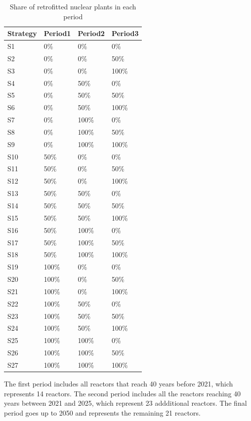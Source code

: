 \begin{table}
	\centering
	\caption{Share of retrofitted nuclear plants in each period}
	\label{tab:shareNukeRetrofit}
	\begin{tabular}{llll}
		\toprule
		Strategy & Period1 & Period2 & Period3 \\
		\midrule
		S1 & 0\% & 0\% & 0\% \\
		S2 & 0\% & 0\% & 50\% \\
		S3 & 0\% & 0\% & 100\% \\
		S4 & 0\% & 50\% & 0\% \\
		S5 & 0\% & 50\% & 50\% \\
		S6 & 0\% & 50\% & 100\% \\
		S7 & 0\% & 100\% & 0\% \\
		S8 & 0\% & 100\% & 50\% \\
		S9 & 0\% & 100\% & 100\% \\
		S10 & 50\% & 0\% & 0\% \\
		S11 & 50\% & 0\% & 50\% \\
		S12 & 50\% & 0\% & 100\% \\
		S13 & 50\% & 50\% & 0\% \\
		S14 & 50\% & 50\% & 50\% \\
		S15 & 50\% & 50\% & 100\% \\
		S16 & 50\% & 100\% & 0\% \\
		S17 & 50\% & 100\% & 50\% \\
		S18 & 50\% & 100\% & 100\% \\
		S19 & 100\% & 0\% & 0\% \\
		S20 & 100\% & 0\% & 50\% \\
		S21 & 100\% & 0\% & 100\% \\
		S22 & 100\% & 50\% & 0\% \\
		S23 & 100\% & 50\% & 50\% \\
		S24 & 100\% & 50\% & 100\% \\
		S25 & 100\% & 100\% & 0\% \\
		S26 & 100\% & 100\% & 50\% \\
		S27 & 100\% & 100\% & 100\% \\
		\bottomrule
	\end{tabular}
\end{table}

The first period includes all reactors that reach 40 years before 2021, which represents 14 reactors. The second period includes all the reactors reaching 40 years between 2021 and 2025, which represent 23 addditional reactors. The final period goes up to 2050 and represents the remaining 21 reactors.

